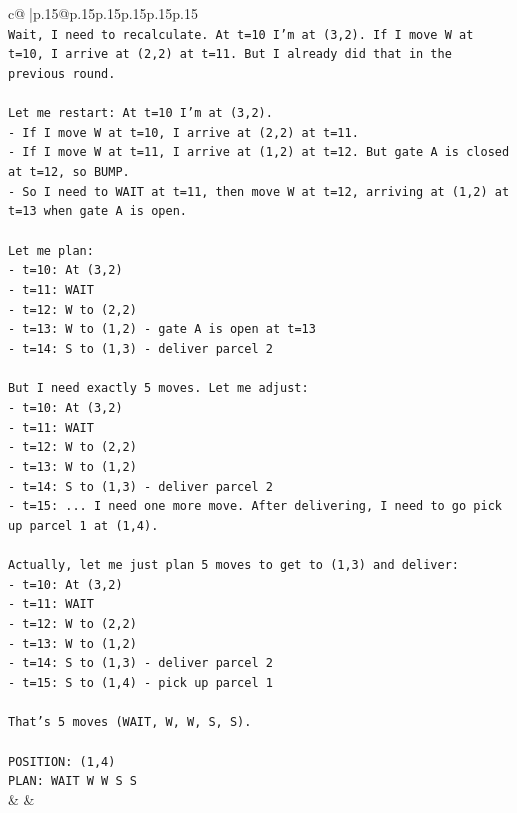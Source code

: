 \documentclass{article}
\begin{document}
{\begin{supertabular}{c@{$\;$}|p{.15\linewidth}@{}p{.15\linewidth}p{.15\linewidth}p{.15\linewidth}p{.15\linewidth}p{.15\linewidth}}
{{{\\ 
\texttt{Wait, I need to recalculate. At t=10 I'm at (3,2). If I move W at t=10, I arrive at (2,2) at t=11. But I already did that in the previous round.} \\
\\ 
\texttt{Let me restart: At t=10 I'm at (3,2). } \\
\texttt{{-} If I move W at t=10, I arrive at (2,2) at t=11.} \\
\texttt{{-} If I move W at t=11, I arrive at (1,2) at t=12. But gate A is closed at t=12, so BUMP.} \\
\texttt{{-} So I need to WAIT at t=11, then move W at t=12, arriving at (1,2) at t=13 when gate A is open.} \\
\\ 
\texttt{Let me plan:} \\
\texttt{{-} t=10: At (3,2)} \\
\texttt{{-} t=11: WAIT} \\
\texttt{{-} t=12: W to (2,2)} \\
\texttt{{-} t=13: W to (1,2) {-} gate A is open at t=13} \\
\texttt{{-} t=14: S to (1,3) {-} deliver parcel 2} \\
\\ 
\texttt{But I need exactly 5 moves. Let me adjust:} \\
\texttt{{-} t=10: At (3,2)} \\
\texttt{{-} t=11: WAIT} \\
\texttt{{-} t=12: W to (2,2)} \\
\texttt{{-} t=13: W to (1,2)} \\
\texttt{{-} t=14: S to (1,3) {-} deliver parcel 2} \\
\texttt{{-} t=15: ... I need one more move. After delivering, I need to go pick up parcel 1 at (1,4).} \\
\\ 
\texttt{Actually, let me just plan 5 moves to get to (1,3) and deliver:} \\
\texttt{{-} t=10: At (3,2)} \\
\texttt{{-} t=11: WAIT} \\
\texttt{{-} t=12: W to (2,2)} \\
\texttt{{-} t=13: W to (1,2)} \\
\texttt{{-} t=14: S to (1,3) {-} deliver parcel 2} \\
\texttt{{-} t=15: S to (1,4) {-} pick up parcel 1} \\
\\ 
\texttt{That's 5 moves (WAIT, W, W, S, S).} \\
\\ 
\texttt{POSITION: (1,4)} \\
\texttt{PLAN: WAIT W W S S} \\
            }
        }
    }
    & & \\ \\


\end{supertabular}}
\end{document}
